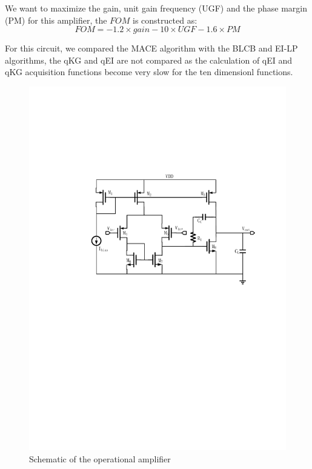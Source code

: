 We want to maximize the gain, unit gain frequency (UGF) and the phase margin (PM) for this amplifier, the $FOM$ is constructed as:
$$
\mathit{FOM} = -1.2 \times \mathit{gain} - 10 \times \mathit{UGF} - 1.6 \times \mathit{PM}
$$

For this circuit, we compared the MACE algorithm with the BLCB and EI-LP
algorithms, the qKG and qEI are not compared as the calculation of qEI and qKG
acquisition functions become very slow for the ten dimensionl functions. 


\begin{figure}[htbp]
    \begin{center}
        \centerline{\includegraphics[width=\columnwidth]{./img/sopam.pdf}}
        \caption{Schematic of the operational amplifier}
        \label{fig:schDAC2014}
    \end{center}
\end{figure}

